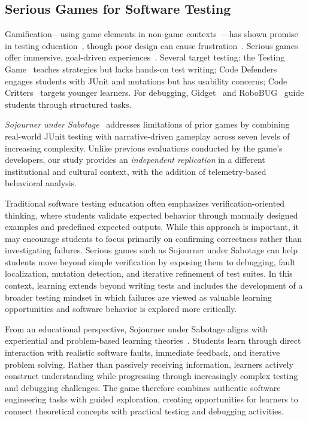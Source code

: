 \documentclass[conference]{IEEEtran}
\begin{document}
\subsection{Serious Games for Software Testing}

Gamification---using game elements in non-game contexts~\cite{deterding2011gamification}---has shown promise in testing education~\cite{blanco2023gamification}, though poor design can cause frustration~\cite{kappen2013kaleidoscope, toda2017dark}.
Serious games offer immersive, goal-driven experiences~\cite{connolly2012systematic, cooper2023serious, quintero2023serious}.
Several target testing: the Testing Game~\cite{valle2017testing} teaches strategies but lacks hands-on test writing; Code Defenders~\cite{fraser2019code, clegg2017teaching} engages students with JUnit and mutations but has usability concerns; Code Critters~\cite{straubinger2024code, straubinger2023code} targets younger learners.
For debugging, Gidget~\cite{lee2014gidget} and RoboBUG~\cite{miljanovic2017robobug} guide students through structured tasks.

\emph{Sojourner under Sabotage}~\cite{straubinger2025sojourner} addresses limitations of prior games by combining real-world JUnit testing with narrative-driven gameplay across seven levels of increasing complexity.
Unlike previous evaluations conducted by the game's developers, our study provides an \emph{independent replication} in a different institutional and cultural context, with the addition of telemetry-based behavioral analysis.

Traditional software testing education often emphasizes verification-oriented thinking, where students validate expected behavior through manually designed examples and predefined expected outputs.
While this approach is important, it may encourage students to focus primarily on confirming correctness rather than investigating failures.
Serious games such as Sojourner under Sabotage can help students move beyond simple verification by exposing them to debugging, fault localization, mutation detection, and iterative refinement of test suites.
In this context, learning extends beyond writing tests and includes the development of a broader testing mindset in which failures are viewed as valuable learning opportunities and software behavior is explored more critically.

From an educational perspective, Sojourner under Sabotage aligns with experiential and problem-based learning theories~\cite{kolb1984experiential, hmelo2004problem}.
Students learn through direct interaction with realistic software faults, immediate feedback, and iterative problem solving.
Rather than passively receiving information, learners actively construct understanding while progressing through increasingly complex testing and debugging challenges.
The game therefore combines authentic software engineering tasks with guided exploration, creating opportunities for learners to connect theoretical concepts with practical testing and debugging activities.
\end{document}
